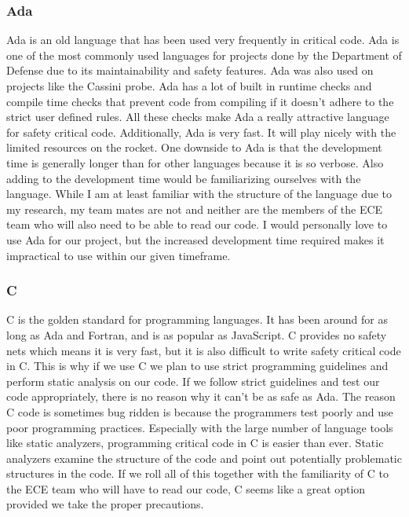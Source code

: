 \documentclass[onecolumn, draftclsnofoot,10pt, compsoc]{IEEEtran}
\begin{document}
\subsubsection{Ada}
Ada is an old language that has been used very frequently in critical code.
Ada is one of the most commonly used languages for projects done by the Department of Defense due to its maintainability and safety features.
Ada was also used on projects like the Cassini probe.
Ada has a lot of built in runtime checks and compile time checks that prevent code from compiling if it doesn't adhere to the strict user defined rules.
All these checks make Ada a really attractive language for safety critical code.
Additionally, Ada is very fast.
It will play nicely with the limited resources on the rocket.
One downside to Ada is that the development time is generally longer than for other languages because it is so verbose.
Also adding to the development time would be familiarizing ourselves with the language.
While I am at least familiar with the structure of the language due to my research, my team mates are not and neither are the members of the ECE team who will also need to be able to read our code.
I would personally love to use Ada for our project, but the increased development time required makes it impractical to use within our given timeframe.

\subsubsection{C}
C is the golden standard for programming languages.
It has been around for as long as Ada and Fortran, and is as popular as JavaScript.
C provides no safety nets which means it is very fast, but it is also difficult to write safety critical code in C.
This is why if we use C we plan to use strict programming guidelines and perform static analysis on our code.
If we follow strict guidelines and test our code appropriately, there is no reason why it can't be as safe as Ada.
The reason C code is sometimes bug ridden is because the programmers test poorly and use poor programming practices.
Especially with the large number of language tools like static analyzers, programming critical code in C is easier than ever.
Static analyzers examine the structure of the code and point out potentially problematic structures in the code.
If we roll all of this together with the familiarity of C to the ECE team who will have to read our code, C seems like a great option provided we take the proper precautions.
\end{document}
